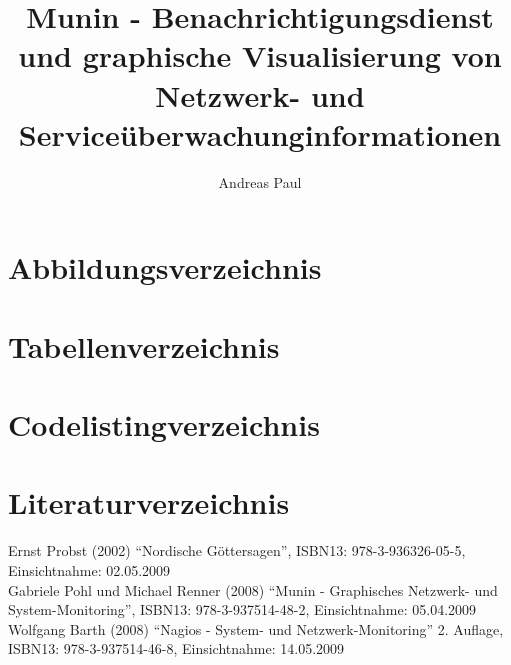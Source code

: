 \documentclass[12pt, a4paper, headsepline]{article}
\author{Andreas Paul}
\title{Munin - Benachrichtigungsdienst und graphische Visualisierung von Netzwerk- und Serviceüberwachunginformationen}
\renewcommand{\refname}{Quellenverzeichnis}
\begin{document}
\setlength{\parindent}{0mm}

\thispagestyle{empty}
\newpage 
\renewcommand{\contentsname}{Inhalt}
\tableofcontents
\newpage

\newpage
 
\newpage
 \newpage
 \newpage
 \newpage
 \newpage
 \newpage



\section{Abbildungsverzeichnis}
\listoffigures
\newpage
\section{Tabellenverzeichnis}
\listoftables
\newpage
\renewcommand{\lstlistlistingname}{}
\section{Codelistingverzeichnis}
\lstlistoflistings
\newpage
\renewcommand{\refname}{} 
\section{Literaturverzeichnis}
\begin{thebibliography}{xxxxxx}
	 Ernst Probst (2002) "`Nordische Göttersagen"', \newline ISBN13: 978-3-936326-05-5, Einsichtnahme: 02.05.2009\\
	 
	  Gabriele Pohl und Michael Renner (2008) 
	 "`Munin - Graphisches Netzwerk- und System-Monitoring"', \newline ISBN13: 978-3-937514-48-2, Einsichtnahme: 05.04.2009\\
	 
	 Wolfgang Barth (2008) "`Nagios - System- und Netzwerk-Monitoring"' 2. Auflage, \newline ISBN13: 978-3-937514-46-8, Einsichtnahme: 14.05.2009\\
	 
\end{thebibliography}
%
\end{document}
